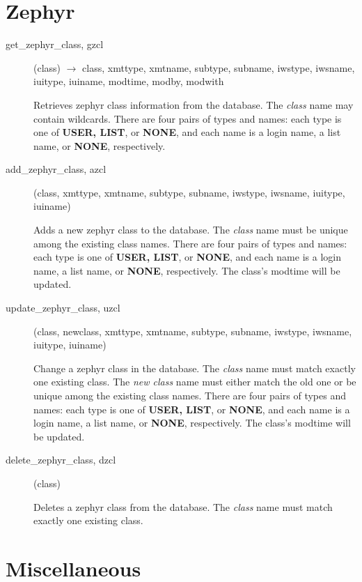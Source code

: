 \documentclass{article}
\begin{document}
\section{Zephyr}

\begin{description}

\item[get\_zephyr\_class, gzcl](class) $\rightarrow$ class, xmttype, xmtname,
subtype, subname, iwstype, iwsname, iuitype, iuiname, modtime, modby,
modwith

Retrieves zephyr class information from the database.  The {\em class}
name may contain wildcards.  There are four pairs of types and names:
each type is one of {\bf USER, LIST}, or {\bf NONE}, and each name is a
login name, a list name, or {\bf NONE}, respectively.

\item[add\_zephyr\_class, azcl](class, xmttype, xmtname, subtype, subname,
iwstype, iwsname, iuitype, iuiname)

Adds a new zephyr class to the database.  The {\em class} name must be
unique among the existing class names.  There are four pairs of types
and names: each type is one of {\bf USER, LIST}, or {\bf NONE}, and each
name is a login name, a list name, or {\bf NONE}, respectively.  The
class's modtime will be updated.

\item[update\_zephyr\_class, uzcl](class, newclass, xmttype, xmtname, subtype,
subname, iwstype, iwsname, iuitype, iuiname)

Change a zephyr class in the database.  The {\em class} name must match
exactly one existing class.  The {\em new class} name must either match
the old one or be unique among the existing class names.  There are
four pairs of types and names: each type is one of {\bf USER, LIST}, or
{\bf NONE}, and each name is a login name, a list name, or {\bf NONE},
respectively.  The class's modtime will be updated.

\item[delete\_zephyr\_class, dzcl](class)

Deletes a zephyr class from the database.  The {\em class} name must
match exactly one existing class.

\end{description}

\section{Miscellaneous}
\end{document}

